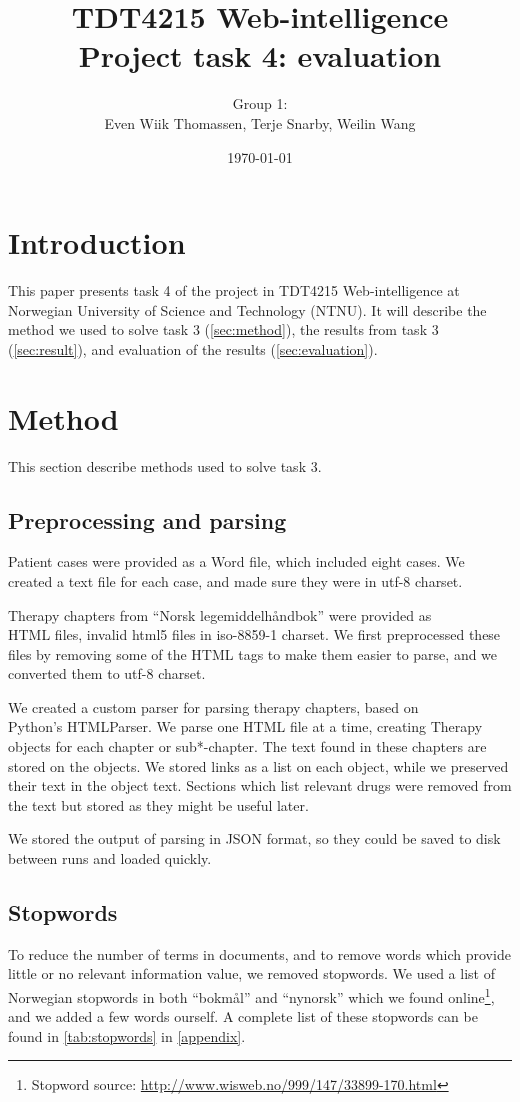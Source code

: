 \documentclass[a4paper, 11pt]{article}
\title{TDT4215 Web-intelligence\\Project task 4: evaluation}
\author{Group 1:\\Even Wiik Thomassen, Terje Snarby, Weilin Wang}
\date{\today}
\begin{document}
\maketitle
\tableofcontents


\section{Introduction}
This paper presents task 4 of the project in TDT4215 Web-intelligence at
Norwegian University of Science and Technology (NTNU). It will
describe the method we used to solve task 3 (\autoref{sec:method}),
the results from task 3 (\autoref{sec:result}),
and evaluation of the results (\autoref{sec:evaluation}).


\section{Method}
\label{sec:method}
This section describe methods used to solve task 3.

\subsection{Preprocessing and parsing}
Patient cases were provided as a Word file, which included eight cases. We
created a text file for each case, and made sure they were in utf-8 charset.

Therapy chapters from ``Norsk legemiddelhåndbok'' were provided as\\
HTML files,
invalid html5 files in iso-8859-1 charset. We first preprocessed these files
by removing some of the HTML tags to make them easier to parse, and we
converted them to utf-8 charset.

We created a custom parser for parsing therapy chapters, based on\\
Python's
HTMLParser. We parse one HTML file at a time, creating Therapy objects for
each chapter or sub*-chapter. The text found in these chapters are stored
on the objects. We stored links as a list on each object, while we preserved
their text in the object text. Sections which list relevant drugs were removed
from the text but stored as they might be useful later.

We stored the output of parsing in JSON format, so they could be saved to disk
between runs and loaded quickly.

\subsection{Stopwords}
To reduce the number of terms in documents, and to remove words which provide
little or no relevant information value, we removed stopwords.
We used a list of Norwegian stopwords in both ``bokmål'' and ``nynorsk'' which we
found online\footnote{Stopword source: \url{http://www.wisweb.no/999/147/33899-170.html}},
and we added a few words ourself. A complete list of these stopwords can
be found in \autoref{tab:stopwords} in \autoref{appendix}.
\end{document}

